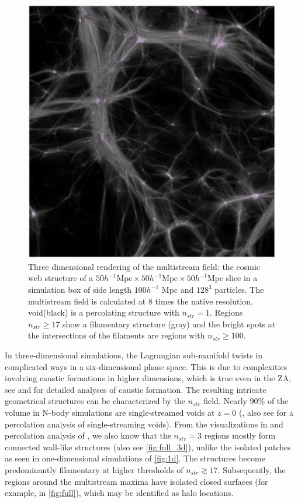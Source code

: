 \begin{figure} 
\centering\includegraphics[width=16cm]{Chapter4/Source_v2/fig1.pdf} 
\caption{Three dimensional rendering of the multistream field: the cosmic web structure of a $ 50 h^{-1} \text{Mpc} \times 50 h^{-1} \text{Mpc} \times 50 h^{-1} \text{Mpc}$ slice in a simulation box of side length $100 h^{-1}$ Mpc and $128^3$ particles. The multistream field is calculated at 8 times the native resolution. void(black) is a percolating structure with $n_{str} = 1$. Regions $n_{str} \geq 17$ show a filamentary structure (gray) and the bright spots at the intersections of the filaments are regions with $n_{str} \geq 100$. }
\label{fig:full_3d}
\end{figure}

In three-dimensional simulations, the Lagrangian sub-manifold twists in complicated ways in a six-dimensional phase space. This is due to complexities involving caustic formations in higher dimensions, which is true even in the ZA, see \citealt{Arnold1982} and \citealt{Hidding2014} for detailed analyses of caustic formation. The resulting intricate geometrical structures can be characterized by the $n_{str}$ field. Nearly  $90\%$ of the volume in N-body simulations are single-streamed voids at $z=0$ (\citealt{Shandarin2012}, also see \citealt{Falck2015} for a percolation analysis of single-streaming voids). From the visualizations in \cite{Ramachandra2015} and percolation analysis of \cite{Ramachandra2017}, we also know that the $n_{str} = 3$ regions mostly form connected wall-like structures (also see \autoref{fig:full_3d}), unlike the isolated patches as seen in one-dimensional simulations of \autoref{fig:1d}. The structures become predominantly filamentary at higher thresholds of $ n_{str} \gtrsim 17$. Subsequently, the regions around the multistream maxima have isolated closed surfaces (for example, in \autoref{fig:full}), which may be identified as halo locations. 



